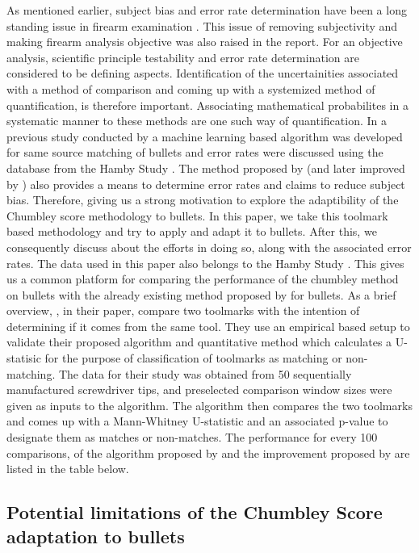 \documentclass[12pt]{article}
\begin{document}
As mentioned earlier, subject bias and error rate determination have
been a long standing issue in firearm examination \citep{NAS:2009}. This
issue of removing subjectivity and making firearm analysis objective was
also raised in the \citet{pcast2016} report. For an objective analysis,
scientific principle testability and error rate determination are
considered to be defining aspects. Identification of the uncertainities
associated with a method of comparison and coming up with a systemized
method of quantification, is therefore important. Associating
mathematical probabilites in a systematic manner to these methods are
one such way of quantification. In a previous study conducted by
\citet{aoas} a machine learning based algorithm was developed for same
source matching of bullets and error rates were discussed using the
database from the Hamby Study \citep{hamby}. The method proposed by
\citet{chumbley} (and later improved by \citet{hadler}) also provides a
means to determine error rates and claims to reduce subject bias.
Therefore, giving us a strong motivation to explore the adaptibility of
the Chumbley score methodology to bullets. In this paper, we take this
toolmark based methodology and try to apply and adapt it to bullets.
After this, we consequently discuss about the efforts in doing so, along
with the associated error rates. The data used in this paper also
belongs to the Hamby Study \citep{hamby}. This gives us a common
platform for comparing the performance of the chumbley method on bullets
with the already existing method proposed by \citet{aoas} for bullets.
As a brief overview, \citet{chumbley}, in their paper, compare two
toolmarks with the intention of determining if it comes from the same
tool. They use an empirical based setup to validate their proposed
algorithm and quantitative method which calculates a U-statisic for the
purpose of classification of toolmarks as matching or non-matching. The
data for their study was obtained from 50 sequentially manufactured
screwdriver tips, and preselected comparison window sizes were given as
inputs to the algorithm. The algorithm then compares the two toolmarks
and comes up with a Mann-Whitney U-statistic and an associated p-value
to designate them as matches or non-matches. The performance for every
100 comparisons, of the algorithm proposed by \citet{chumbley} and the
improvement proposed by \citet{hadler} are listed in the table below.

\subsection{Potential limitations of the Chumbley Score adaptation to
bullets}\label{potential-limitations-of-the-chumbley-score-adaptation-to-bullets}
\end{document}
